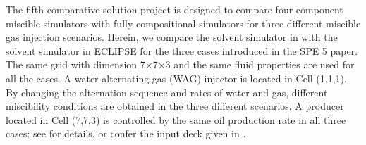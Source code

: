 
The fifth comparative solution project \citep{killough16000fifth} is designed to compare
four-component miscible simulators with fully compositional simulators
for three different miscible gas injection scenarios. Herein,
{\revised we compare the solvent simulator in \opmflow with} the solvent simulator in
ECLIPSE for the three cases introduced in the SPE 5 paper. The same
grid with dimension 7$\times$7$\times$3
and the same fluid properties are used for all the cases. A
water-alternating-gas (WAG) injector is located in Cell (1,1,1). By
changing the alternation sequence and rates of water and gas, different
miscibility conditions are obtained in the three different scenarios. A
producer located in Cell {\revised (7,7,3)} is controlled by the same oil
production rate in all three cases; see
\cite{killough16000fifth} for details, or confer the input deck given in
\opmdata.

